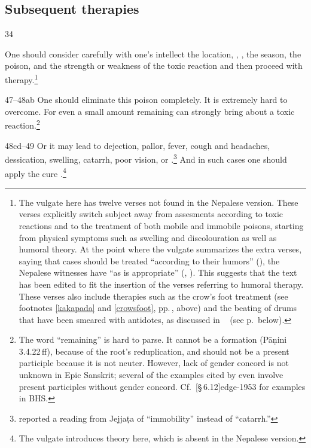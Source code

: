 \begin{translation}
\subsection{Subsequent therapies}

\item[34]

One should consider carefully with one's intellect the location,
, , the season, the
poison, and the strength or weakness of the toxic reaction and then
proceed with therapy.\footnote{The vulgate here has twelve verses not
    found in the Nepalese version.  These verses explicitly switch subject
    away from assesments according to toxic reactions and to the treatment of
    both mobile and immobile poisons, starting from physical symptoms such as
    swelling and discolouration as well as humoral theory. At the point where
    the vulgate summarizes the extra verses, saying that cases should be
    treated “according to their humors” (), the Nepalese
    witnesses have “as is appropriate” (,
    ).  This suggests that the text has been edited to fit
    the insertion of the verses referring to humoral therapy.  These verses also 
    include therapies such as the crow's foot treatment (see footnotes
    \ref{kakapada} and \ref{crowsfoot}, pp.\,\pageref{kakapada}, 
    \pageref{crowsfoot} above) and the beating of drums 
    that have been smeared with antidotes, as discussed in \SS\ 
     (see p.\,\pageref{dundubhi} below).}

\item [47--48ab] One should eliminate this poison completely.  It is
extremely hard to overcome. For even a small amount remaining can
strongly bring about a toxic reaction.\footnote{The word
     “remaining” is hard to parse.  It cannot be a
    \dev{ṇamul} formation (Pāṇini 3.4.22\,ff), because of the root's
    reduplication, and should not be a present participle because it is
    not neuter.  However, lack of gender concord is not unknown in Epic
    Sanskrit; several of the examples cited by
    \citet[\S\,10.2.1]{ober-2003} even involve present participles without
    gender concord. Cf.\ \volcite{1}[\S\,6.12]{edge-1953} for examples in
    BHS.}

\item[48cd--49] Or it may lead to dejection, pallor, fever, cough and
headaches, dessication, swelling, catarrh, poor vision,
 or
.\footnote{ reported
    a reading from Jejjaṭa of \dev{staimitya} “immobility” instead of
    \dev{pratiśyāya} “catarrh.”} And in such cases one should apply the cure
    \diff{as appropriate}.\footnote{The vulgate introduces \dev{doṣa} theory
        here, which is absent in the Nepalese version.}


\end{translation}

